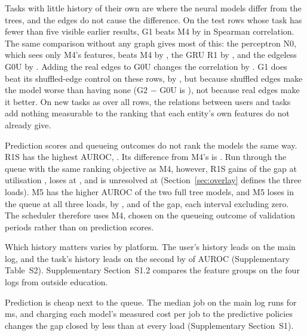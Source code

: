 Tasks with little history of their own are where the neural models differ from the trees,
and the edges do not cause the difference. On the  test rows whose task has
fewer than five visible earlier results, G1 beats M4 by  in Spearman correlation. The same comparison without any graph gives most of
this: the perceptron N0, which sees only M4's features, beats M4 by , the
GRU R1 by , and the edgeless G0U by . Adding the real edges to G0U changes the correlation by . G1 does beat its shuffled-edge control on these rows, by
, but because shuffled edges make the model worse
than having none (G2 $-$ G0U is ), not because real
edges make it better. On new tasks as over all rows, the relations between users and tasks
add nothing measurable to the ranking that each entity's own features do not already give.

\begin{sloppypar}
Prediction scores and queueing outcomes do not rank the models the same way. R1S has the
highest AUROC, . Its difference from M4's  is
. Run through the queue with the same ranking
objective as M4, however, R1S gains
 of the gap at utilisation , loses
 at , and is unresolved at 
(Section~\ref{sec:overlay} defines the three loads). M5 has the higher AUROC of the two full
tree models, and M5 loses in the queue at all three loads, by ,
 and  of the gap, each interval excluding zero. The scheduler
therefore uses M4, chosen on the queueing outcome of validation periods rather than on
prediction scores.
\end{sloppypar}

Which history matters varies by platform. The user's history leads on the main log, and the
task's history leads on the second by  of AUROC (Supplementary Table~S2).
Supplementary Section~S1.2 compares the feature groups on the four logs from outside
education.

Prediction is cheap next to the queue. The median job on the main log runs for
 ms, and charging each model's measured cost per job to the predictive
policies changes the gap closed by less than  at every load (Supplementary
Section~S1).
